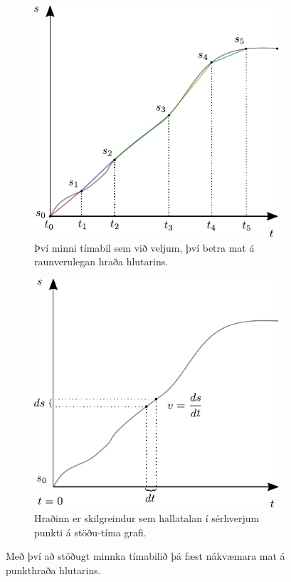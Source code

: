 \begin{figure}[H]
    \centering
\begin{subfigure}[h]{.4\textwidth}
    \centering
    \includegraphics[width=\linewidth]{figures/stodutimagraf-skiptingar-linur.pdf}
    \caption{Því minni tímabil sem við veljum, því betra mat á raunverulegan hraða hlutarins.}
    \label{fig:st-skiptingar-medalhradi}
\end{subfigure}
\hfill
\begin{subfigure}[h]{.4\textwidth}
    \centering
    \includegraphics[width=\linewidth]{figures/stodutimagraf-orsmaed.pdf}
    \caption{Hraðinn er skilgreindur sem hallatalan í sérhverjum punkti á stöðu-tíma grafi.}
    \label{subfig:st-hradi}
\end{subfigure}
\caption{Með því að stöðugt minnka tímabilið þá fæst nákvæmara mat á punkthraða hlutarins.}
\end{figure}

